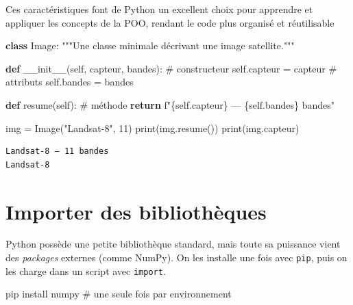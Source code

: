 \documentclass[
  french,
  11pt,
  letterpaper,
  open=any,
  twoside=false,
  french]{scrbook}
\newenvironment{Shaded}{\begin{snugshade}}{\end{snugshade}}
\newcommand{\BuiltInTok}[1]{\textcolor[rgb]{0.00,0.23,0.31}{#1}}
\newcommand{\CommentTok}[1]{\textcolor[rgb]{0.37,0.37,0.37}{#1}}
\newcommand{\ControlFlowTok}[1]{\textcolor[rgb]{0.00,0.23,0.31}{\textbf{#1}}}
\newcommand{\DecValTok}[1]{\textcolor[rgb]{0.68,0.00,0.00}{#1}}
\newcommand{\ExtensionTok}[1]{\textcolor[rgb]{0.00,0.23,0.31}{#1}}
\newcommand{\FunctionTok}[1]{\textcolor[rgb]{0.28,0.35,0.67}{#1}}
\newcommand{\KeywordTok}[1]{\textcolor[rgb]{0.00,0.23,0.31}{\textbf{#1}}}
\newcommand{\NormalTok}[1]{\textcolor[rgb]{0.00,0.23,0.31}{#1}}
\newcommand{\OperatorTok}[1]{\textcolor[rgb]{0.37,0.37,0.37}{#1}}
\newcommand{\SpecialCharTok}[1]{\textcolor[rgb]{0.37,0.37,0.37}{#1}}
\newcommand{\SpecialStringTok}[1]{\textcolor[rgb]{0.13,0.47,0.30}{#1}}
\newcommand{\StringTok}[1]{\textcolor[rgb]{0.13,0.47,0.30}{#1}}
\newcommand{\VariableTok}[1]{\textcolor[rgb]{0.07,0.07,0.07}{#1}}
\begin{document}
Ces caractéristiques font de Python un excellent choix pour apprendre et
appliquer les concepts de la POO, rendant le code plus organisé et
réutilisable

\begin{Shaded}
\begin{Highlighting}[]
\KeywordTok{class}\NormalTok{ Image:}
    \CommentTok{"""Une classe minimale décrivant une image satellite."""}

    \KeywordTok{def} \FunctionTok{\_\_init\_\_}\NormalTok{(}\VariableTok{self}\NormalTok{, capteur, bandes):   }\CommentTok{\# constructeur}
        \VariableTok{self}\NormalTok{.capteur }\OperatorTok{=}\NormalTok{ capteur              }\CommentTok{\# attributs}
        \VariableTok{self}\NormalTok{.bandes }\OperatorTok{=}\NormalTok{ bandes}

    \KeywordTok{def}\NormalTok{ resume(}\VariableTok{self}\NormalTok{):                       }\CommentTok{\# méthode}
        \ControlFlowTok{return} \SpecialStringTok{f"}\SpecialCharTok{\{}\VariableTok{self}\SpecialCharTok{.}\NormalTok{capteur}\SpecialCharTok{\}}\SpecialStringTok{ — }\SpecialCharTok{\{}\VariableTok{self}\SpecialCharTok{.}\NormalTok{bandes}\SpecialCharTok{\}}\SpecialStringTok{ bandes"}

\NormalTok{img }\OperatorTok{=}\NormalTok{ Image(}\StringTok{"Landsat{-}8"}\NormalTok{, }\DecValTok{11}\NormalTok{)}
\BuiltInTok{print}\NormalTok{(img.resume())}
\BuiltInTok{print}\NormalTok{(img.capteur)}
\end{Highlighting}
\end{Shaded}

\begin{verbatim}
Landsat-8 — 11 bandes
Landsat-8
\end{verbatim}

\section{Importer des
bibliothèques}\label{importer-des-bibliothuxe8ques}

Python possède une petite bibliothèque standard, mais toute sa puissance
vient des \emph{packages} externes (comme NumPy). On les installe une
fois avec \texttt{pip}, puis on les charge dans un script avec
\texttt{import}.

\begin{Shaded}
\begin{Highlighting}[]
\ExtensionTok{pip}\NormalTok{ install numpy          }\CommentTok{\# une seule fois par environnement}
\end{Highlighting}
\end{Shaded}
\end{document}
